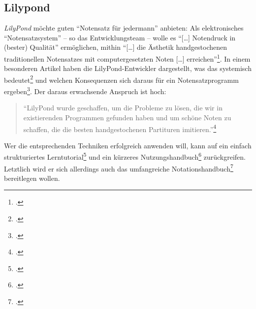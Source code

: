 %
%
%



\subsection{Lilypond}

\emph{LilyPond} möchte guten \enquote{Notensatz für jedermann} anbieten: Als
elektronisches \enquote{Notensatzsystem} -- so das Entwicklungsteam -- wolle es
\enquote{[\ldots] Notendruck in (bester) Qualität} ermöglichen, mithin
\enquote{[\ldots] die Ästhetik handgestochenen traditionellen Notensatzes mit
computergesetzten Noten [\ldots] erreichen}\footcite[vgl.][\nopage
wp]{LilyPond2018a}. In einem besonderen Artikel haben die LilyPond-Entwickler
dargestellt, was das systemisch bedeutet\footcite[vgl.][5ff]{LilyPond2018d} und
welchen Konsequenzen sich daraus für ein Notensatzprogramm
ergeben\footcite[vgl.][8ff]{LilyPond2018d}. Der daraus erwachsende Anspruch ist
hoch:

\begin{quote}\begin{em}
  \enquote{LilyPond wurde geschaffen, um die Probleme zu lösen, die wir in
  existierenden Programmen gefunden haben und um schöne Noten zu schaffen, die
  die besten handgestochenen Partituren imitieren.}\footcite[vgl.][2]{LilyPond2018d}
\end{em}\end{quote}

Wer die entsprechenden Techniken erfolgreich anwenden will, kann auf ein einfach
strukturiertes Lerntutorial\footcite[vgl.][20ff]{LilyPond2018b} und ein kürzeres
Nutzungshandbuch\footcite[vgl.][1ff]{LilyPond2018e} zurückgreifen. Letztlich
wird er sich allerdings auch das umfangreiche
Notationshandbuch\footcite[vgl.][1ff]{LilyPond2018c} bereitlegen wollen.


